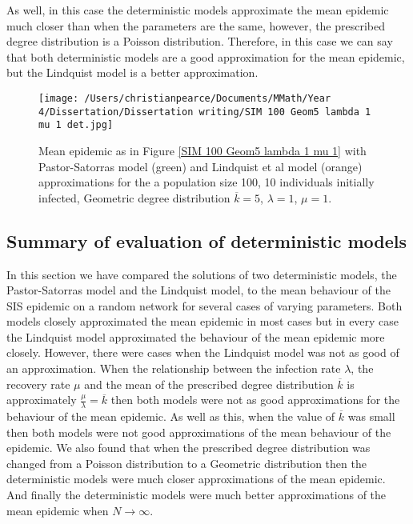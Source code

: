 \documentclass{uonmathsreport}
\begin{document}
As well, in this case the deterministic models approximate the mean epidemic much closer than when the parameters are the same, however, the prescribed degree distribution is a Poisson distribution.  Therefore, in this case we can say that both deterministic models are a good approximation for the mean epidemic, but the Lindquist model is a better approximation.

\begin{figure}
\begin{center}
\texttt{[image: /Users/christianpearce/Documents/MMath/Year 4/Dissertation/Dissertation writing/SIM 100 Geom5 lambda 1 mu 1 det.jpg]}
\end{center}
\caption{Mean epidemic as in Figure \ref{SIM 100 Geom5 lambda 1 mu 1} with Pastor-Satorras model (green) and Lindquist et al model (orange) approximations for the a population size 100, 10 individuals initially infected, Geometric degree distribution $\overline{k}=5$, $\lambda=1$, $\mu=1$.}
\label{7.12}
\end{figure}

\subsection{Summary of evaluation of deterministic models} \label{subsec:7.6}

In this section we have compared the solutions of two deterministic models, the Pastor-Satorras model and the Lindquist model, to the mean behaviour of the SIS epidemic on a random network for several cases of varying parameters. Both models closely approximated the mean epidemic in most cases but in every case the Lindquist model approximated the behaviour of the mean epidemic more closely. However, there were cases when the Lindquist model was not as good of an approximation. When the relationship between the infection rate $\lambda$, the recovery rate $\mu$ and the mean of the prescribed degree distribution $\overline{k}$ is approximately $\frac{\mu}{\lambda}=\overline{k}$ then both models were not as good approximations for the behaviour of the mean epidemic. As well as this, when the value of $\overline{k}$ was small then both models were not good approximations of the mean behaviour of the epidemic. We also found that when the prescribed degree distribution was changed from a Poisson distribution to a Geometric distribution then the deterministic models were much closer approximations of the mean epidemic. And finally the deterministic models were much better approximations of the mean epidemic when $N \rightarrow \infty$.
\end{document}

